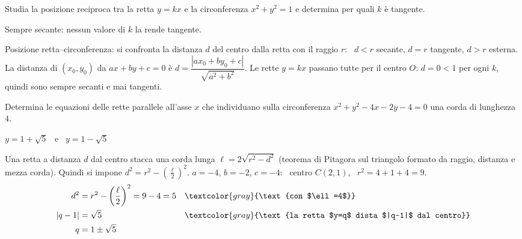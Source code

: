 \begin{question}[ID=3.10, subtitle={Posizione di $y=kx$ rispetto a $x^2+y^2=1$ e tangenza}, difficulty=difficile, tags={parametrico, retta, circonferenza}]
Studia la posizione reciproca tra la retta $y=kx$ e la circonferenza $x^2+y^2=1$ e determina per quali $k$ è tangente.
\begin{solution}
Sempre secante: nessun valore di $k$ la rende tangente.
\end{solution}
\begin{explanation}
Posizione retta–circonferenza: si confronta la distanza $d$ del centro dalla retta con il raggio $r$: \ $d<r$ secante, $d=r$ tangente, $d>r$ esterna. La distanza di $(x_0,y_0)$ da $ax+by+c=0$ è $d=\dfrac{|ax_0+by_0+c|}{\sqrt{a^2+b^2}}$.
Le rette $y=kx$ passano tutte per il centro $O$: $d=0<1$ per ogni $k$, quindi sono sempre secanti e mai tangenti.
\end{explanation}
\end{question}


\begin{question}[ID=3.11, subtitle={Corda di lunghezza 4 con retta orizzontale sulla circonferenza}, difficulty=media, tags={circonferenza, retta, corda}]
Determina le equazioni delle rette parallele all'asse $x$ che individuano sulla circonferenza $x^2+y^2-4x-2y-4=0$ una corda di lunghezza $4$.
\begin{solution}
$y=1+\sqrt5$ \ e \ $y=1-\sqrt5$
\end{solution}
\begin{explanation}
Una retta a distanza $d$ dal centro stacca una corda lunga $\ell=2\sqrt{r^2-d^2}$ (teorema di Pitagora sul triangolo formato da raggio, distanza e mezza corda). Quindi si impone $d^2=r^2-\left(\tfrac\ell2\right)^2$.
$a=-4$, $b=-2$, $c=-4$: \ centro $C(2,1)$, \ $r^2=4+1+4=9$.
\[\begin{aligned}
d^2 &= r^2-\left(\dfrac\ell2\right)^2=9-4=5 && \textcolor{gray}{\text{con $\ell=4$}}\\
|q-1| &= \sqrt5 && \textcolor{gray}{\text{la retta $y=q$ dista $|q-1|$ dal centro}}\\
q &= 1\pm\sqrt5
\end{aligned}\]
\end{explanation}
\end{question}


